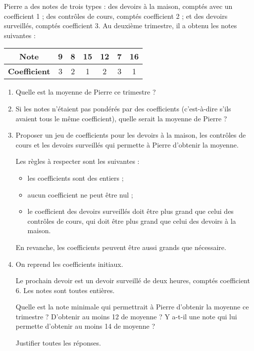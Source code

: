 
\begin{exercice}\label{exoSeconde-0039}

Pierre a des notes de trois types : des devoirs à la maison, comptés
avec un coefficient 1 ; des contrôles de cours, comptés coefficient 2
; et des devoirs surveillés, comptés coefficient 3. Au deuxième
trimestre, il a obtenu les notes suivantes :

\begin{center}
  \begin{tabular}{|c||c|c|c|c|c|c|}
      \hline
    \textbf{Note} & 9 & 8 & 15 & 12 & 7 & 16  \\
    \hline
    \textbf{Coefficient} & 3 & 2 & 1 & 2 & 3 & 1 \\
    \hline
  \end{tabular}      
\end{center}

\begin{enumerate}
\item Quelle est la moyenne de Pierre ce trimestre ?

\item Si les notes n'étaient pas pondérés par des coefficients (c'est-à-dire s'ils avaient tous le même coefficient), quelle serait la moyenne de Pierre ?

\item Proposer un jeu de coefficients pour les devoirs à la maison, les contrôles de cours et les devoirs surveillés qui permette à Pierre d'obtenir la moyenne.

  Les règles à respecter sont les suivantes :
  \begin{itemize}
  \item les coefficients sont des entiers ;
  \item aucun coefficient ne peut être nul ;
  \item le coefficient des devoirs surveillés doit être plus grand que
    celui des contrôles de cours, qui doit être plus grand que celui
    des devoirs à la maison.
  \end{itemize}
  En revanche, les coefficients peuvent être aussi grands que nécessaire.    

\item On reprend les coefficients initiaux.

  Le prochain devoir est un devoir surveillé de deux heures, comptés
  coefficient 6. Les notes sont toutes entières.

  Quelle est la note minimale qui permettrait à Pierre d'obtenir la
  moyenne ce trimestre ? D'obtenir au moins 12 de moyenne ? Y a-t-il
  une note qui lui permette d'obtenir au moins 14 de moyenne ? 

  Justifier toutes les réponses.
\end{enumerate}

\end{exercice}

